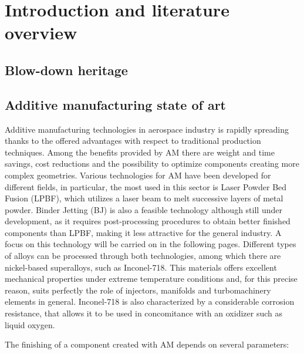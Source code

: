 \section{Introduction and literature overview}
\label{sec:introduction}

\subsection{Blow-down heritage}
\label{subsec:blowdown_intro}

\subsection{Additive manufacturing state of art}
\label{subsec:additive_intro}

Additive manufacturing technologies in aerospace industry is rapidly spreading thanks to the offered advantages with respect to traditional production techniques. Among the benefits provided by AM there are weight and time savings, cost reductions and  the possibility to optimize components creating more complex geometries\cite{materials_and_desing}.
Various technologies for AM have been developed for different fields, in particular, the most used in this sector is Laser Powder Bed Fusion (LPBF), which utilizes a laser beam to melt successive layers of metal powder. Binder Jetting (BJ) is also a feasible technology although still under development, as it requires post-processing procedures to obtain better finished components than LPBF, making it less attractive for the general industry. A focus on this technology will be carried on in the following pages. Different types of alloys can be processed through both technologies, among which there are nickel-based superalloys, such as Inconel-718. This materials offers excellent mechanical properties under extreme temperature conditions and, for this precise reason, suits perfectly the role of injectors, manifolds and turbomachinery elements in general. Inconel-718 is also characterized by a considerable corrosion resistance, that allows it to be used in concomitance with an oxidizer such as liquid oxygen\cite{Inconel_vs_steel}. 

The finishing of a component created with AM depends on several parameters: 

